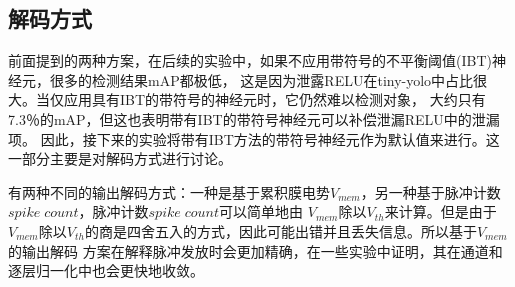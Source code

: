 \subsection{解码方式}
\par
前面提到的两种方案，在后续的实验中，如果不应用带符号的不平衡阈值(IBT)神经元，很多的检测结果mAP都极低，
这是因为泄露RELU在tiny-yolo中占比很大。当仅应用具有IBT的带符号的神经元时，它仍然难以检测对象，
大约只有7.3％的mAP，但这也表明带有IBT的带符号神经元可以补偿泄漏RELU中的泄漏项。
因此，接下来的实验将带有IBT方法的带符号神经元作为默认值来进行。这一部分主要是对解码方式进行讨论。
\par
有两种不同的输出解码方式：一种是基于累积膜电势$V_{mem}$，另一种基于脉冲计数$spike \;count$，脉冲计数$spike \;count$可以简单地由
$V_{mem}$除以$V_{th}$来计算。但是由于$V_{mem}$除以$V_{th}$的商是四舍五入的方式，因此可能出错并且丢失信息。所以基于$V_{mem}$的输出解码
方案在解释脉冲发放时会更加精确，在一些实验中证明，其在通道和逐层归一化中也会更快地收敛。
